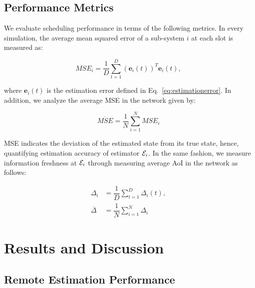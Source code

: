 \subsection{Performance Metrics} 

We evaluate scheduling performance in terms of the following metrics. In every
simulation, the average mean squared error of a sub-system $i$ at each slot is
measured as:

\begin{equation*}
  MSE_i = \dfrac{1}{D} \sum_{t=1}^{D}{(\boldsymbol{e}_i(t))^T \boldsymbol{e}_i(t)},
\end{equation*}

where $\boldsymbol{e}_i(t)$ is the estimation error defined in
Eq.~\eqref{eq:estimationerror}. In addition, we analyze the average MSE in the
network given by:

\begin{equation*}
  \overline{MSE} = \dfrac{1}{N} \sum_{i=1}^{N}{MSE_i}
\end{equation*}

MSE indicates the deviation of the estimated state from its true state, hence,
quantifying estimation accuracy of estimator $\mathcal{E}_i$. In the same fashion,
we measure information freshness at $\mathcal{E}_i$ through measuring average AoI
in the network as follows:

\begin{align*}
  \Delta_i &= \dfrac{1}{D} \sum_{t=1}^{D}{\Delta_i(t)}, \\
  \overline{\Delta} &= \dfrac{1}{N} \sum_{i=1}^{N}{\Delta_i}
\end{align*}

\section{Results and Discussion} \label{sec:results}

\subsection{Remote Estimation Performance}

